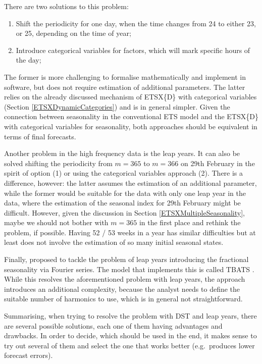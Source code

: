 \documentclass[]{book}
\providecommand{\tightlist}{%
  \setlength{\itemsep}{0pt}\setlength{\parskip}{0pt}}
\theoremstyle{definition}
\theoremstyle{definition}
\theoremstyle{definition}
\theoremstyle{definition}
\theoremstyle{remark}
\begin{document}
There are two solutions to this problem:

\begin{enumerate}
\def\labelenumi{\arabic{enumi}.}
\tightlist
\item
  Shift the periodicity for one day, when the time changes from 24 to either 23, or 25, depending on the time of year;
\item
  Introduce categorical variables for factors, which will mark specific hours of the day;
\end{enumerate}

The former is more challenging to formalise mathematically and implement in software, but does not require estimation of additional parameters. The latter relies on the already discussed mechanism of ETSX\{D\} with categorical variables (Section \ref{ETSXDynamicCategories}) and is in general simpler. Given the connection between seasonality in the conventional ETS model and the ETSX\{D\} with categorical variables for seasonality, both approaches should be equivalent in terms of final forecasts.

Another problem in the high frequency data is the leap years. It can also be solved shifting the periodicity from \(m=365\) to \(m=366\) on 29th February in the spirit of option (1) or using the categorical variables approach (2). There is a difference, however: the latter assumes the estimation of an additional parameter, while the former would be suitable for the data with only one leap year in the data, where the estimation of the seasonal index for 29th February might be difficult. However, given the discussion in Section \ref{ETSXMultipleSeasonality}, maybe we should not bother with \(m=365\) in the first place and rethink the problem, if possible. Having 52 / 53 weeks in a year has similar difficulties but at least does not involve the estimation of so many initial seasonal states.

Finally, \citet{DeLivera2010} proposed to tackle the problem of leap years introducing the fractional seasonality via Fourier series. The model that implements this is called TBATS \citep[it is an exponential smoothing state space model with Box-Cox transformation, ARMA errors, Trend and Seasonal components,][]{DeLivera2011}. While this resolves the aforementioned problem with leap years, the approach introduces an additional complexity, because the analyst needs to define the suitable number of harmonics to use, which is in general not straightforward.

Summarising, when trying to resolve the problem with DST and leap years, there are several possible solutions, each one of them having advantages and drawbacks. In order to decide, which should be used in the end, it makes sense to try out several of them and select the one that works better (e.g.~produces lower forecast errors).
\end{document}
